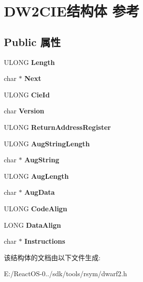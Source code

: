 \hypertarget{struct_d_w2_c_i_e}{}\section{D\+W2\+C\+I\+E结构体 参考}
\label{struct_d_w2_c_i_e}
\subsection*{Public 属性}
\begin{DoxyCompactItemize}
\item 
\mbox{\label{struct_d_w2_c_i_e_ad6fed64ee6c61ab43582322c7e36e3c6}} 
U\+L\+O\+NG {\bfseries Length}
\item 
\mbox{\label{struct_d_w2_c_i_e_a2da45518b38c8c50313802f0d9903c23}} 
char $\ast$ {\bfseries Next}
\item 
\mbox{\label{struct_d_w2_c_i_e_a3c20cd64f5da29f2bbafd0f19c383d8f}} 
U\+L\+O\+NG {\bfseries Cie\+Id}
\item 
\mbox{\label{struct_d_w2_c_i_e_a69ea218f48134584f54b569c032a7eb4}} 
char {\bfseries Version}
\item 
\mbox{\label{struct_d_w2_c_i_e_ace1035d6d381f1bb6bb626f2ca14b524}} 
U\+L\+O\+NG {\bfseries Return\+Address\+Register}
\item 
\mbox{\label{struct_d_w2_c_i_e_a3dbb6a193d889e6dc318bb9dd99f0c9f}} 
U\+L\+O\+NG {\bfseries Aug\+String\+Length}
\item 
\mbox{\label{struct_d_w2_c_i_e_a4e934aa9a0f5278e4147fe145fe7e559}} 
char $\ast$ {\bfseries Aug\+String}
\item 
\mbox{\label{struct_d_w2_c_i_e_aab72b04d281e505d4cf1d1510ce083d2}} 
U\+L\+O\+NG {\bfseries Aug\+Length}
\item 
\mbox{\label{struct_d_w2_c_i_e_a300b252dd2e95ffdba906ebf3402e118}} 
char $\ast$ {\bfseries Aug\+Data}
\item 
\mbox{\label{struct_d_w2_c_i_e_a87fce2264c40a27d2da4e3e33117998f}} 
U\+L\+O\+NG {\bfseries Code\+Align}
\item 
\mbox{\label{struct_d_w2_c_i_e_ac6a2274aba44022c602f0128cdef152b}} 
L\+O\+NG {\bfseries Data\+Align}
\item 
\mbox{\label{struct_d_w2_c_i_e_a11bc36797f37c425944295d3ecf2b167}} 
char $\ast$ {\bfseries Instructions}
\end{DoxyCompactItemize}


该结构体的文档由以下文件生成\+:\begin{DoxyCompactItemize}
\item 
E\+:/\+React\+O\+S-\/0../sdk/tools/rsym/dwarf2.\+h\end{DoxyCompactItemize}
